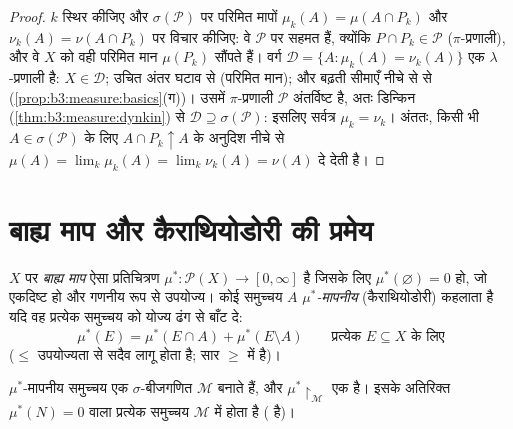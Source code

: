 \begin{proof}
$k$ स्थिर कीजिए और $\sigma(\mathcal
P)$ पर परिमित मापों $\mu_k(A) = \mu(A \cap
P_k)$ और $\nu_k(A) = \nu(A \cap P_k)$ पर विचार
कीजिए: वे $\mathcal P$ पर सहमत हैं, क्योंकि $P \cap P_k \in \mathcal
P$ ($\pi$-प्रणाली), और वे
$X$ को वही परिमित मान $\mu(P_k)$ सौंपते हैं। वर्ग $\mathcal D = \{A : \mu_k(A) =
\nu_k(A)\}$ एक
$\lambda$-प्रणाली है: $X \in \mathcal D$; उचित अंतर घटाव से (परिमित मान); और बढ़ती
सीमाएँ नीचे से  से (\cref{prop:b3:measure:basics}(ग))। उसमें $\pi$-प्रणाली $\mathcal P$
अंतर्विष्ट है, अतः डिन्किन (\cref{thm:b3:measure:dynkin}) से $\mathcal D \supseteq
\sigma(\mathcal P)$: इसलिए सर्वत्र $\mu_k = \nu_k$।
अंततः, किसी भी $A \in \sigma(\mathcal P)$ के लिए $A
\cap P_k \uparrow A$ के अनुदिश नीचे से 
$\mu(A) = \lim_k\mu_k(A) =
\lim_k\nu_k(A) = \nu(A)$ दे देती है।
\end{proof}

\section{बाह्य माप और कैराथियोडोरी की प्रमेय}

\begin{definition}\label{def:b3:measure:outer}
$X$ पर \emph{बाह्य माप} ऐसा प्रतिचित्रण $\mu^* \colon \mathcal P(X) \to [0, \infty]$
है जिसके लिए $\mu^*(\varnothing) = 0$ हो, जो एकदिष्ट हो और गणनीय रूप से उपयोज्य।
कोई समुच्चय $A$ \emph{$\mu^*$-मापनीय} (कैराथियोडोरी) कहलाता है
यदि वह प्रत्येक समुच्चय को योज्य ढंग से बाँट दे:
\[
\mu^*(E) = \mu^*(E \cap A) + \mu^*(E \setminus A)
\qquad \text{प्रत्येक } E \subseteq X \text{ के लिए}
\]
($\leq$ उपयोज्यता से सदैव लागू होता है; सार $\geq$ में है)।
\end{definition}

\begin{theorem}[कैराथियोडोरी]\label{thm:b3:measure:caratheodory}
$\mu^*$-मापनीय समुच्चय एक $\sigma$-बीजगणित $\mathcal
M$ बनाते हैं, और $\mu^*\restriction_{\mathcal M}$
एक  है। इसके अतिरिक्त $\mu^*(N) = 0$ वाला प्रत्येक समुच्चय $\mathcal M$ में
होता है ( \emph{} है)।
\end{theorem}

